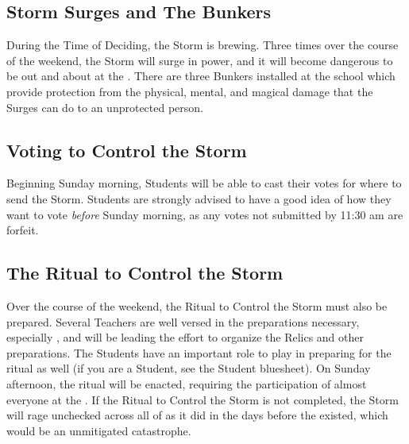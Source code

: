 \documentclass[blue]{GL2020}
\begin{document}
\subsection*{Storm Surges and The Bunkers}
During the Time of Deciding, the Storm is brewing. Three times over the course of the weekend, the Storm will surge in power, and it will become dangerous to be out and about at the \pSc{}. There are three Bunkers installed at the school which provide protection from the physical, mental, and magical damage that the Surges can do to an unprotected person.

\subsection*{Voting to Control the Storm}
Beginning Sunday morning, Students will be able to cast their votes for where to send the Storm. Students are strongly advised to have a good idea of how they want to vote \emph{before} Sunday morning, as any votes not submitted by 11:30 am are forfeit.

\subsection*{The Ritual to Control the Storm}
Over the course of the weekend, the Ritual to Control the Storm must also be prepared. Several Teachers are well versed in the preparations necessary, especially \cLibrarian{\full}, and will be leading the effort to organize the Relics and other preparations. The Students have an important role to play in preparing for the ritual as well (if you are a Student, see the Student bluesheet). On Sunday afternoon, the ritual will be enacted, requiring the participation of almost everyone at the \pSchool{}. If the Ritual to Control the Storm is not completed, the Storm will rage unchecked across all of \pEarth{} as it did in the days before the \pSchool{} existed, which would be an unmitigated catastrophe.
\end{document}
